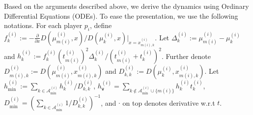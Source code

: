 \documentclass{article}
\newtheorem{theorem}{Theorem}
\begin{document}
Based on the arguments described above, we derive the dynamics using Ordinary Differential Equations (ODEs). To ease the presentation, we use the following notations. 
For each player $p_i$, define $f^{(i)}_k := -\frac{\partial}{\partial x} D(\mu^{(i)}_{m(i)},x)/D(\mu^{(i)}_{k},x)\big|_{x=x^{(i)}_{m(i),k}}$.  Let $\Delta^{(i)}_{k}:=\mu^{(i)}_{m(i)}-\mu^{(i)}_{k}$ and $h^{(i)}_{k} := f^{(i)}_k (t^{(i)}_{m(i)})^2\Delta^{(i)}_{k}/{(t^{(i)}_{m(i)}+t^{(i)}_k)^2}$. Further denote $D^{(i)}_{m(i),k}:=D(\mu^{(i)}_{m(i)},x^{(i)}_{m(i),k})$ and $D^{(i)}_{k,k}:=D(\mu^{(i)}_{k},x^{(i)}_{m(i),k})$. Let $h^{(i)}_{\min}:= \sum_{k\in\mathcal{A}^{(i)}_{\min}}h^{(i)}_{k}/D^{(i)}_{k,k}$, $h^{(i)}_{\texttt{w}} = \sum_{k\not\in\mathcal{A}^{(i)}_{\min}\cup\{m(i)\}}h^{(i)}_{k}t^{(i)}_k$, $D^{(i)}_{\min} = (\sum_{k\in\mathcal{A}^{(i)}_{\min}}1/D^{(i)}_{k,k})^{-1}$, and $\cdot$ on top denotes derivative w.r.t $t$.
\end{document}
